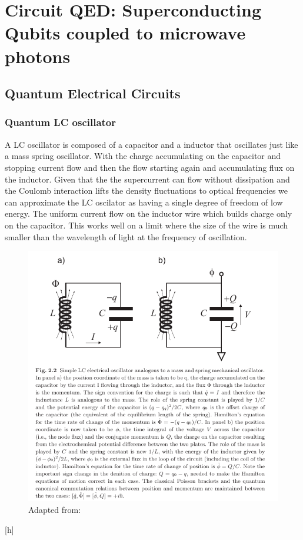 \documentclass[12pt]{article}
\numberwithin{equation}{subsection}
\newcommand\page[1]{
{
}
}
\begin{document}
\section{Circuit QED: Superconducting Qubits coupled to microwave photons\cite{Girvin2015CircuitQS}}
\page{7}
\subsection{Quantum Electrical Circuits}
\subsubsection{Quantum LC oscillator}
A LC oscillator is composed of a capacitor and a inductor that oscillates just like a mass spring oscillator. With the charge accumulating on the capacitor and stopping current flow and then the flow starting again and accumulating flux on the inductor.
Given that the the supercurrent can flow without dissipation and the Coulomb interaction lifts the density fluctuations to optical frequencies we can approximate the LC oscilator as having a single degree of freedom of low energy. The uniform current flow on the inductor wire which builds charge only on the capacitor. This works well on a limit where the size of the wire is much smaller than the wavelength of light at the frequency of oscillation. 

\begin{figure}[h]
\includegraphics[scale=3]{images/9-lc-oscillator.png}
\caption{Adapted from: \cite{Girvin2015CircuitQS}}
\end{figure}[h]
\end{document}
